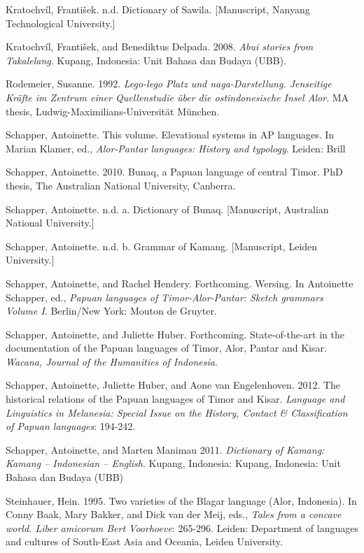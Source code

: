 \documentclass[a4paper]{article}
\begin{document}
Kratochv\'il, Franti\v{s}ek. n.d. Dictionary of Sawila. [Manuscript, Nanyang Technological University.]

Kratochv\'il, Franti\v{s}ek, and Benediktus Delpada. 2008. \textit{Abui stories from Takalelang}. Kupang, Indonesia: Unit Bahasa dan Budaya (UBB).

Rodemeier, Susanne. 1992. \textit{Lego-lego Platz und naga-Darstellung. Jenseitige Kr\"afte im Zentrum einer Quellenstudie \"uber die ostindonesische Insel Alor}. MA thesis, Ludwig-Maximilians-Universit\"at M\"unchen.

Schapper, Antoinette. This volume. Elevational systems in AP languages. In Marian Klamer, ed., \textit{Alor-Pantar languages: History and typology}. Leiden: Brill

Schapper, Antoinette. 2010. Bunaq, a Papuan language of central Timor. PhD thesis, The Australian National University, Canberra.

Schapper, Antoinette. n.d. a. Dictionary of Bunaq. [Manuscript, Australian National University.]

Schapper, Antoinette. n.d. b. Grammar of Kamang. [Manuscript, Leiden University.]

Schapper, Antoinette, and Rachel Hendery. Forthcoming. Wersing. In Antoinette Schapper, ed., \textit{Papuan languages of Timor-Alor-Pantar: Sketch grammars Volume I}. Berlin/New York: Mouton de Gruyter.

Schapper, Antoinette, and Juliette Huber. Forthcoming. State-of-the-art in the documentation of the Papuan languages of Timor, Alor, Pantar and Kisar. \textit{Wacana, Journal of the Humanities of Indonesia}. 

Schapper, Antoinette, Juliette Huber, and Aone van Engelenhoven. 2012. The historical relations of the Papuan languages of Timor and Kisar. \textit{Language and Linguistics in Melanesia: Special Issue on the History, Contact \& Classification of Papuan languages}: 194-242.

Schapper, Antoinette, and Marten Manimau 2011. \textit{Dictionary of Kamang: Kamang -- Indonesian -- English}. Kupang, Indonesia: Kupang, Indonesia: Unit Bahasa dan Budaya (UBB) 

Steinhauer, Hein. 1995. Two varieties of the Blagar language (Alor, Indonesia). In Conny Baak, Mary Bakker, and Dick van der Meij, eds., \textit{Tales from a concave world. Liber amicorum Bert Voorhoeve}: 265-296. Leiden: Department of languages and cultures of South-East Asia and Oceania, Leiden University.
\end{document}
